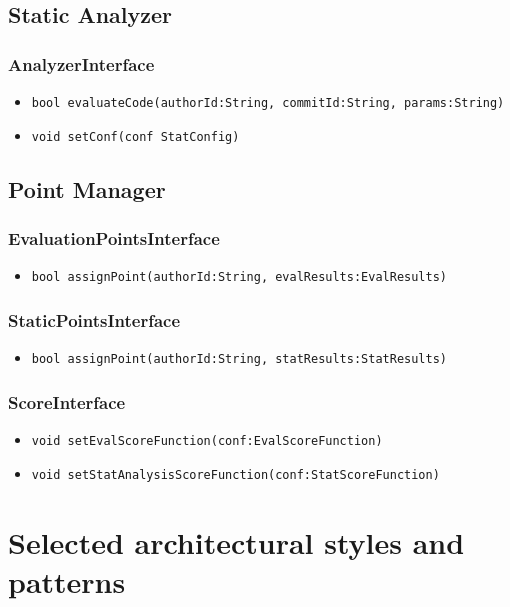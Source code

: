 \subsection{Static Analyzer}
\subsubsection{AnalyzerInterface}
\begin{itemize}
    \item \texttt{bool evaluateCode(authorId:String, commitId:String, params:String)}
    \item \texttt{void setConf(conf StatConfig)}
\end{itemize}

\subsection{Point Manager}
\subsubsection{EvaluationPointsInterface}
\begin{itemize}
    \item \texttt{bool assignPoint(authorId:String, evalResults:EvalResults)}
\end{itemize}

\subsubsection{StaticPointsInterface}
\begin{itemize}
    \item \texttt{bool assignPoint(authorId:String, statResults:StatResults)}
\end{itemize}

\subsubsection{ScoreInterface}
\begin{itemize}
    \item \texttt{void setEvalScoreFunction(conf:EvalScoreFunction)}
    \item \texttt{void setStatAnalysisScoreFunction(conf:StatScoreFunction)}
\end{itemize}

\newpage

\section{Selected architectural styles and patterns}
\label{s:selected-architectural-styles-and-patterns}%

